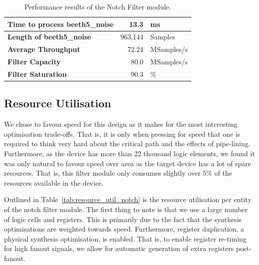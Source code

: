 \documentclass[]{article}
\begin{document}
\begin{table}[htbp]
	\caption{Performance results of the Notch Filter module.}
	\label{tab:performance_results}
	\begin{center}
		\begin{tabular}{l|rl}
		\hline

		\hline
			\textbf{Time to process beeth5\_noise}	& 13.3 		& ms \\
		\hline
			\textbf{Length of beeth5\_noise}		& 963,144 	& Samples \\
		\hline
			\textbf{Average Throughput}				& 72.24 	& MSamples/s \\
		\hline
			\textbf{Filter Capacity}				& 80.0 		& MSamples/s \\
		\hline
			\textbf{Filter Saturation}				& 90.3 		& \% \\
		\hline

		\hline
		\end{tabular}
	\end{center}
\end{table}


\subsection{Resource Utilisation} %
\label{sub:resource_utilisation}

We chose to favour speed for this design as it makes for the most interesting optimisation trade-offs. That is, it is only when pressing for speed that one is required to think very hard about the critical path and the effects of pipe-lining.
Furthermore, as the device has more than 22 thousand logic elements, we found it was only natural to favour speed over area as the target device has a lot of spare resources.
That is, this filter module only consumes slightly over 5\% of the resources available in the device.

Outlined in Table~\ref{tab:resource_util_notch} is the resource utilisation per entity of the notch filter module.
The first thing to note is that we use a large number of logic cells and registers. This is primarily due to the fact that the synthesis optimisations are weighted towards speed.
Furthermore, register duplication, a physical synthesis optimisation, is enabled. That is, to enable register re-timing for high fanout signals, we allow for automatic generation of extra registers post-fanout.
\end{document}
